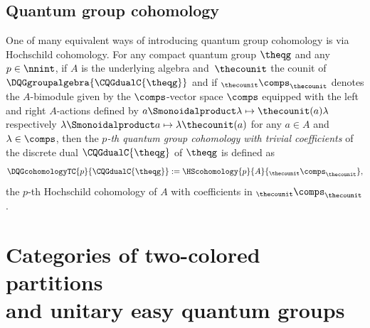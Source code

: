 \documentclass[pdftex]{sigma}
\numberwithin{equation}{section}
\begin{document}
\subsection{Quantum group cohomology}
\label{section:quantum-groups-cohomology}
{
  \newcommand{\thederivs}{\mathrm{Der}_\epsilon(A)}
  \newcommand{\anycoc}{\eta}
  \newcommand{\leftop}{a_1}
  \newcommand{\rightop}{a_2}
  \newcommand{\anygen}{e}
  \newcommand{\thetuple}{x}
  \newcommand{\thetuplex}[1]{\thetuple_{#1}}
  \newcommand{\genels}[1]{a_{#1}}
  \newcommand{\theorder}{p}
  \newcommand{\thealgebra}{A}
  \newcommand{\themod}{{}_\thecounit\comps_\thecounit}
  \newcommand{\somescal}{\lambda}
  \newcommand{\someop}{a}
One of many equivalent ways of introducing  quantum group cohomology is via Hochschild cohomology.
  For any compact quantum group $\theqg$ and any $\theorder\in\nnint$, if $\thealgebra$ is the underlying algebra and~$\thecounit$ the counit of  $\DQGgroupalgebra{\CQGdualC{\theqg}}$ and if $\themod$ denotes the $\thealgebra$-bimodule given by the $\comps$-vector space $\comps$ equipped with the left and right $\thealgebra$-actions defined by $\someop\Smonoidalproduct\somescal\mapsto \thecounit(\someop)\somescal$ respectively $\somescal\Smonoidalproduct\someop\mapsto \somescal\thecounit(\someop)$ for any $\someop\in\thealgebra$ and $\somescal\in\comps$,
  then the \emph{$\theorder$-th quantum group cohomology with trivial coefficients} of the discrete dual $\CQGdualC{\theqg}$ of $\theqg$ is defined as
  \[
    \DQGcohomologyTC{\theorder}{\CQGdualC{\theqg}}:=\HScohomology{\theorder}{\thealgebra}{\themod},
  \]
  the $\theorder$-th Hochschild cohomology of $\thealgebra$ with coefficients in $\themod$.
}

\section[Categories of two-colored partitions and unitary easy quantum groups]{Categories of two-colored partitions\\ and unitary easy quantum groups}
\label{section:easy}
\end{document}
